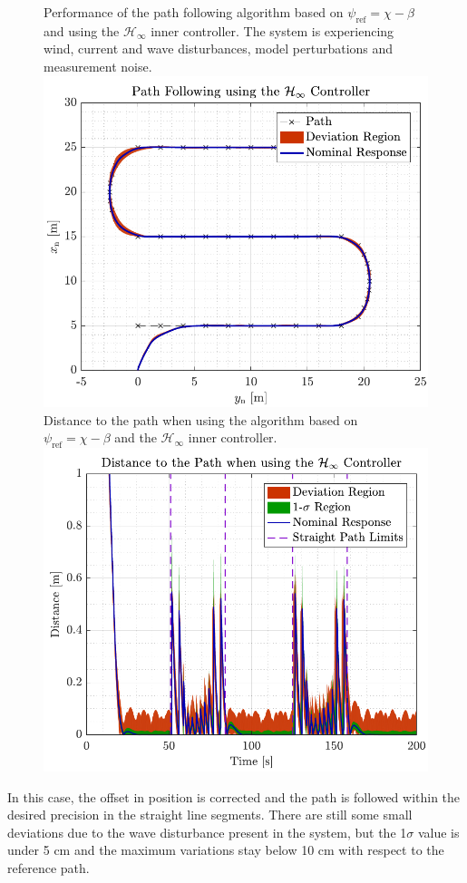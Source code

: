 \begin{figure}[H]
	\captionbox 
	{   
		Performance of the path following algorithm based on $\psi_\mathrm{ref}=\chi-\beta$ and using the $\mathcal{H}_\infty$ inner controller. The system is experiencing wind, current and wave disturbances, model perturbations and measurement noise. \label{fig:robustcorrect}
	}                                                                 
	{                                                                  
		\includegraphics[width=.45\textwidth]{figures/path_rob}         
	}                                                                    
	\hspace{5pt}                                                          
	\captionbox  
	{      
			Distance to the path when using the algorithm based on $\psi_\mathrm{ref}=\chi-\beta$ and the $\mathcal{H}_\infty$ inner controller. \label{fig:distrobustcorrect}
	}                                                                          
	{
		\includegraphics[width=.45\textwidth]{figures/dist_rob}
	}
\end{figure}

In this case, the offset in position is corrected and the path is followed within the desired precision in the straight line segments. There are still some small deviations due to the wave disturbance present in the system, but the 1$\sigma$ value is under 5 cm and the maximum variations stay below 10 cm with respect to the reference path.

